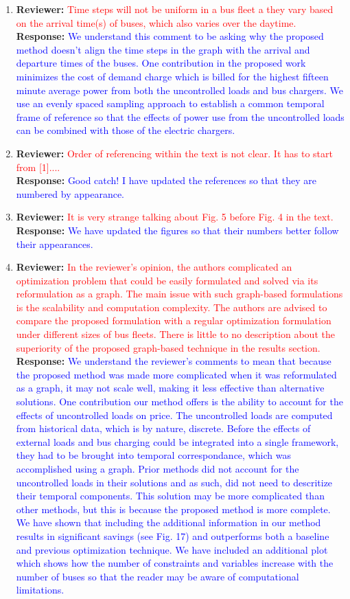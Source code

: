 \documentclass{article}
\newcommand\formatfeedback[2]
{%
	\textbf{Reviewer:} \textcolor{red}{#1} 
	\leavevmode\\[0.1in] \textbf{Response:} \textcolor{blue}{#2}
}
\begin{document}
\begin{enumerate}
	\item \formatfeedback{Time steps will not be uniform in a bus fleet a they vary based on the arrival time(s) of buses, which also varies over the daytime.}{ We understand this comment to be asking why the proposed method doesn't align the time steps in the graph with the arrival and departure times of the buses. One contribution in the proposed work minimizes the cost of demand charge which is billed for the highest fifteen minute average power from both the uncontrolled loads and bus chargers. We use an evenly spaced sampling approach to establish a common temporal frame of reference so that the effects of power use from the uncontrolled loads can be combined with those of the electric chargers.} 
	\item \formatfeedback{Order of referencing within the text is not clear. It has to start from [1]....}{Good catch! I have updated the references so that they are numbered by appearance.}
	\item \formatfeedback{It is very strange talking about Fig. 5 before Fig. 4 in the text.}{We have updated the figures so that their numbers better follow their appearances.}
	\item \formatfeedback{In the reviewer's opinion, the authors complicated an optimization problem that could be easily formulated and solved via its reformulation as a graph. The main issue with such graph-based formulations is the scalability and computation complexity. The authors are advised to compare the proposed formulation with a regular optimization formulation under different sizes of bus fleets. There is little to no description about the superiority of the proposed graph-based technique in the results section.}{We understand the reviewer's comments to mean that because the proposed method was made more complicated when it was reformulated as a graph, it may not scale well, making it less effective than alternative solutions. One contribution our method offers is the ability to account for the effects of uncontrolled loads on price. The uncontrolled loads are computed from historical data, which is by nature, discrete. Before the effects of external loads and bus charging could be integrated into a single framework, they had to be brought into temporal correspondance, which was accomplished using a graph. Prior methods did not account for the uncontrolled loads in their solutions and as such, did not need to descritize their temporal components. This solution may be more complicated than other methods, but this is because the proposed method is more complete. We have shown that including the additional information in our method results in significant savings (see Fig. 17) and outperforms both a baseline and previous optimization technique. We have included an additional plot which shows how the number of constraints and variables increase with the number of buses so that the reader may be aware of computational limitations. 
 }
\end{enumerate}
\end{document}
